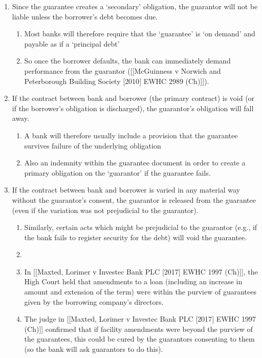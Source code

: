 \documentclass[
]{article}
\providecommand{\tightlist}{%
  \setlength{\itemsep}{0pt}\setlength{\parskip}{0pt}}
\begin{document}
\begin{enumerate}
\def\labelenumi{\arabic{enumi}.}
\tightlist
\item
  Since the guarantee creates a `secondary' obligation, the guarantor
  will not be liable unless the borrower's debt becomes due.

  \begin{enumerate}
  \def\labelenumii{\arabic{enumii}.}
  \tightlist
  \item
    Most banks will therefore require that the `guarantee' is `on
    demand' and payable as if a `principal debt'
  \item
    So once the borrower defaults, the bank can immediately demand
    performance from the guarantor ({[}{[}McGuinness v Norwich and
    Peterborough Building Society {[}2010{]} EWHC 2989 (Ch){]}{]}).
  \end{enumerate}
\item
  If the contract between bank and borrower (the primary contract) is
  void (or if the borrower's obligation is discharged), the guarantor's
  obligation will fall away.

  \begin{enumerate}
  \def\labelenumii{\arabic{enumii}.}
  \tightlist
  \item
    A bank will therefore usually include a provision that the guarantee
    survives failure of the underlying obligation
  \item
    Also an indemnity within the guarantee document in order to create a
    primary obligation on the `guarantor' if the guarantee fails.
  \end{enumerate}
\item
  If the contract between bank and borrower is varied in any material
  way without the guarantor's consent, the guarantor is released from
  the guarantee (even if the variation was not prejudicial to the
  guarantor).

  \begin{enumerate}
  \def\labelenumii{\arabic{enumii}.}
  \tightlist
  \item
    Similarly, certain acts which might be prejudicial to the guarantor
    (e.g., if the bank fails to register security for the debt) will
    void the guarantee.
  \item
  \item
    In {[}{[}Maxted, Lorimer v Investec Bank PLC {[}2017{]} EWHC 1997
    (Ch){]}{]}, the High Court held that amendments to a loan (including
    an increase in amount and extension of the term) were within the
    purview of guarantees given by the borrowing company's directors.
  \item
    The judge in {[}{[}Maxted, Lorimer v Investec Bank PLC {[}2017{]}
    EWHC 1997 (Ch){]}{]} confirmed that if facility amendments were
    beyond the purview of the guarantees, this could be cured by the
    guarantors consenting to them (so the bank will ask guarantors to do
    this).
  \end{enumerate}
\end{enumerate}
\end{document}
